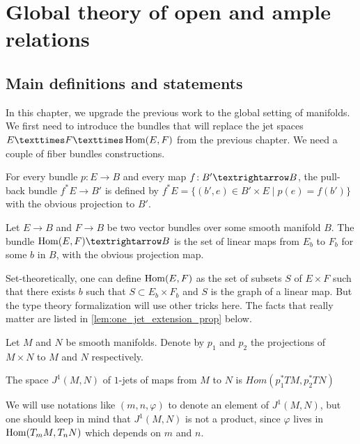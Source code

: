 \chapter{Global theory of open and ample relations}
\label{chap:global}

\section{Main definitions and statements}%
\label{sec:global_statements}
In this chapter, we upgrade the previous work to the global setting of
manifolds.
We first need to introduce the bundles that will replace the jet spaces
$E × F × \Hom(E, F)$ from the previous chapter. We need a couple of
fiber bundles constructions.

\begin{definition}
\label{def:pull_back_bundle}
\leanok
{}
For every bundle $p : E → B$ and every map $f \co B' → B$,
the pull-back bundle $f^*E → B'$ is defined by
$f^*E = \{(b', e) ∈ B' × E \;|\; p(e) = f(b')\}$ with
the obvious projection to $B'$.
\end{definition}

\begin{definition}
\label{def:hom_bundle}
\leanok
{}
Let $E → B$ and $F → B$ be two vector bundles over some smooth manifold
$B$. The bundle $\Hom(E, F) → B$ is the set of linear maps from
$E_b$ to $F_b$ for some $b$ in $B$, with the obvious projection map.
\end{definition}

Set-theoretically, one can define $\operatorname{Hom}(E, F)$ as the set of subsets
$S$ of $E × F$ such that there exists $b$ such that $S ⊂ E_b × F_b$
and $S$ is the graph of a linear map. But the type theory formalization
will use other tricks here. The facts that really matter are listed in
\cref{lem:one_jet_extension_prop} below.

\begin{definition}
\label{def:one_jet_space}
\leanok
{}
Let $M$ and $N$ be smooth manifolds. Denote by
$p_1$ and $p_2$ the projections of $M × N$ to
$M$ and $N$ respectively.

The space $J^1(M, N)$ of $1$-jets of maps from $M$ to $N$ is
$Hom(p_1^*TM, p_2^*TN)$
\end{definition}

We will use notations like $(m, n, φ)$ to denote an element
of $J^1(M, N)$,
but one should keep in mind that $J^1(M, N)$ is not a product,
since $φ$ lives in $\operatorname{Hom}(T_mM, T_nN)$ which depends on $m$ and $n$.


